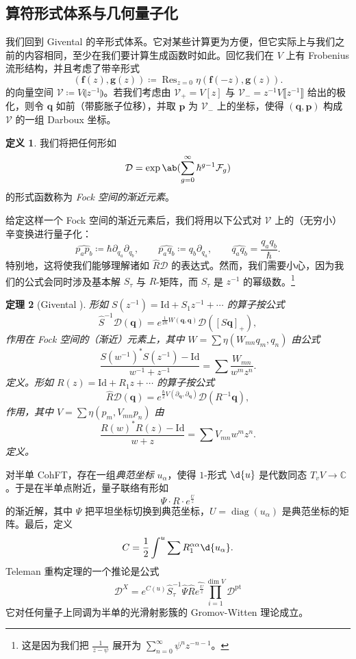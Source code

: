 \documentclass{amsart}
\newtheorem{thm}{定理}[section]
\theoremstyle{definition}
\newtheorem{defn}[thm]{定义}
\theoremstyle{remark}
\theoremstyle{plain}
\theoremstyle{definition}
\theoremstyle{remark}
\newcommand{\C}{\mathbb{C}}
\newcommand{\mc}[1]{\mathcal{#1}}
\newcommand{\mbf}[1]{\mathbf{#1}}
\newcommand{\bq}{\mbf{q}}
\newcommand{\bp}{\mbf{p}}
\newcommand{\mr}[1]{\mathrm{#1}}
\newcommand{\on}[1]{\operatorname{#1}}
\newcommand{\wh}[1]{\widehat{#1}}
\newcommand{\1}{\mathbf{1}}
\newcommand{\2}{\mathbf{2}}
\newcommand{\3}{\mathbf{3}}
\newcommand{\ps}[1]{\llbracket #1 \rrbracket}
\newcommand{\ls}[1]{\llparenthesis #1 \rrparenthesis}
\begin{document}
\subsection{算符形式体系与几何量子化}%
\label{sub:Operator formalism and geometric quantization}

我们回到 Givental 的辛形式体系。它对某些计算更为方便，但它实际上与我们之前的内容相同，至少在我们要计算生成函数时如此。回忆我们在 $V$ 上有 Frobenius 流形结构，并且考虑了带辛形式
\[ (\mbf{f}(z), \mbf{g}(z)) \coloneqq \on{Res}_{z=0} \eta(\mbf{f}(-z), \mbf{g}(z)). \]
的向量空间 $\mc{V}\coloneqq V\ls{z^{-1}}$。若我们考虑由 $\mc{V}_+ = V[z]$ 与 $\mc{V}_- = z^{-1}V\ps{z^{-1}}$ 给出的极化，则令 $\bq$ 如前（带膨胀子位移），并取 $\bp$ 为 $\mc{V}_-$ 上的坐标，使得 $(\bq, \bp)$ 构成 $\mc{V}$ 的一组 Darboux 坐标。

\begin{defn}
    我们将把任何形如
    \[ \mc{D} = \exp\ab(\sum_{g=0}^{\infty} \hbar^{g-1} \mc{F}_g) \]
    的形式函数称为 \textit{Fock 空间的渐近元素}。
\end{defn}

给定这样一个 Fock 空间的渐近元素后，我们将用以下公式对 $\mc{V}$ 上的（无穷小）辛变换进行量子化：
\[ \wh{p_a p_b} \coloneqq \hbar \partial_{q_a} \partial_{q_b}, \qquad \wh{p_a q_b} \coloneqq q_b \partial_{q_a}, \qquad \wh{q_a q_b} = \frac{q_a q_b}{\hbar}. \]
特别地，这将使我们能够理解诸如 $\hat{R} \mc{D}$ 的表达式。然而，我们需要小心，因为我们的公式会同时涉及基本解 $S_{\tau}$ 与 $R$-矩阵，而 $S_{\tau}$ 是 $z^{-1}$ 的幂级数。\footnote{这是因为我们把 $\frac{1}{z-\psi}$ 展开为 $\sum_{n=0}^{\infty} \psi^n z^{-n-1}$。}

\begin{thm}[Givental {\cite{Givental2001quantization}}]
    形如 $S(z^{-1}) = \mr{Id} + S_1 z^{-1} + \cdots$ 的算子按公式
    \[ \hat{S}^{-1} \mc{D}(\bq) = e^{\frac{1}{2\hbar}W(\bq,\bq)} \mc{D}([S \bq]_+), \]
    作用在 Fock 空间的（渐近）元素上，其中 $W = \sum \eta(W_{mn}q_m, q_n)$ 由公式
    \[ \frac{S(w^{-1})^* S(z^{-1}) - \mr{Id}}{w^{-1}+z^{-1}} = \sum \frac{W_{mn}}{w^m z^n}. \]
    定义。形如 $R(z) = \mr{Id} + R_1 z + \cdots$ 的算子按公式
    \[ \hat{R}\mc{D}(\bq) = e^{\frac{\hbar}{2} V(\partial_{\bq}, \partial_{\bq})} \mc{D}(R^{-1} \bq), \]
    作用，其中 $V = \sum \eta(p_m, V_{mn} p_n)$ 由
    \[ \frac{R(w)^* R(z) - \mr{Id}}{w+z} = \sum V_{mn} w^m z^n. \]
    定义。
\end{thm}

对半单 CohFT，存在一组\textit{典范坐标} $u_{\alpha}$，使得 $1$-形式 $\d{u}$ 是代数同态 $T_v V \to \C$。于是在半单点附近，量子联络有形如
\[ \Psi \cdot  R \cdot e^{\frac{U}{z}} \]
的渐近解，其中 $\Psi$ 把平坦坐标切换到典范坐标，$U = \on{diag}(u_{\alpha})$ 是典范坐标的矩阵。最后，定义
\[ C = \frac{1}{2} \int^u \sum R_1^{\alpha\alpha} \d{u_{\alpha}}. \]
Teleman 重构定理的一个推论是公式
\[ \mc{D}^X = e^{C(u)} \hat{S}^{-1}_{\tau} \hat{\Psi} \hat{R} \wh{e^{\frac{U}{z}}} \prod_{i=1}^{\dim V} \mc{D}^{\mr{pt}} \]
它对任何量子上同调为半单的光滑射影簇的 Gromov-Witten 理论成立。
\end{document}
